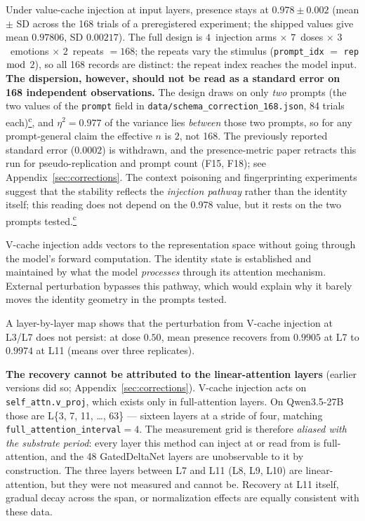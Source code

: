\documentclass[11pt,a4paper]{article}
\newcommand{\corrmark}{\hyperref[sec:corrections]{\textsuperscript{c}}}
\begin{document}
Under value-cache injection at input layers, presence stays at
$0.978 \pm 0.002$ (mean $\pm$ SD across the 168 trials of a preregistered
experiment; the shipped values give mean $0.97806$, SD $0.00217$).
The full design is $4$~injection arms $\times$ $7$~doses $\times$
$3$~emotions $\times$ $2$~repeats $=168$; the repeats vary the stimulus
(\texttt{prompt\_idx} $=$ \texttt{rep} $\bmod$ $2$), so all 168 records are
distinct: the repeat index reaches the model input.
\textbf{The dispersion, however, should not be read as a standard error on
168 independent observations.} The design draws on only \emph{two}
prompts (the two values of the \texttt{prompt} field in
\texttt{data/schema\_correction\_168.json}, 84 trials each)\corrmark, and $\eta^2 = 0.977$ of the variance lies \emph{between} those two
prompts, so for any prompt-general claim the effective $n$ is $2$, not 168.
The previously reported standard error ($0.0002$) is withdrawn, and the
presence-metric paper retracts this run for pseudo-replication and prompt
count (F15, F18); see Appendix~\ref{sec:corrections}.
The context poisoning and fingerprinting experiments suggest that the
stability reflects the \emph{injection pathway} rather than the identity
itself; this reading does not depend on the 0.978 value, but it rests on
the two prompts tested.\corrmark

V-cache injection adds vectors to the representation space without going
through the model's forward computation. The identity state is established
and maintained by what the model \emph{processes} through its attention
mechanism. External perturbation bypasses this pathway, which would explain
why it barely moves the identity geometry in the prompts tested.

A layer-by-layer map shows that the perturbation from V-cache injection at
L3/L7 does not persist: at dose $0.50$, mean presence recovers from $0.9905$
at L7 to $0.9974$ at L11 (means over three replicates).

\textbf{The recovery cannot be attributed to the linear-attention layers}
(earlier versions did so; Appendix~\ref{sec:corrections}). V-cache injection acts on
\texttt{self\_attn.v\_proj}, which exists only in full-attention layers.
On Qwen3.5-27B those are L\{3, 7, 11, \ldots, 63\} --- sixteen layers at a
stride of four, matching \texttt{full\_attention\_interval}$=4$. The
measurement grid is therefore \emph{aliased with the substrate period}: every
layer this method can inject at or read from is full-attention, and the 48
GatedDeltaNet layers are unobservable to it by construction. The three layers
between L7 and L11 (L8, L9, L10) are linear-attention, but they were not
measured and cannot be. Recovery at L11 itself, gradual decay across the
span, or normalization effects are equally consistent with these data.
\end{document}
